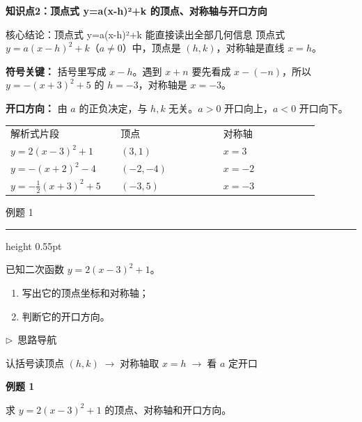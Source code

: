 \documentclass{exam-zh}
\newcommand{\edukai}{\kaishu}
\newcommand{\eduSectionTitle}[1]{%
  \needspace{5\baselineskip}%
  \vspace{2mm}
  {\color{edu-blue}\bfseries\large #1}\par
  \vspace{3mm}
}
\newenvironment{eduSubQuestionItem}[1]{%
  \needspace{4\baselineskip}%
  \vspace{2mm}
  \par\noindent
  \hangindent=8mm\hangafter=1
  {\color{edu-blue}\bfseries #1}\enspace
  \begingroup
  \color{edu-ink}
}{%
  \endgroup
  \par
  \vspace{3mm}
}
\newenvironment{eduAuxItem}[1]{%
  \needspace{4\baselineskip}%
  \vspace{2mm}
  \par\noindent
  \hangindent=8mm\hangafter=1
  {\color{edu-blue}\edukai $\triangleright$~#1}\enspace
  \begingroup
  \color{edu-ink}
  \edukai
}{%
  \endgroup
  \par
  \vspace{4mm}
}
\newenvironment{eduProblemBlock}[1][题目]{%
  \needspace{8\baselineskip}
  {\small\color{edu-muted}#1}\par
  \vspace{1.5mm}
  {\color{edu-blue}\hrule height 0.55pt}
  \vspace{4.5mm}
  \begingroup
  \color{edu-ink}
  \large
  \setlength{\parskip}{2.2mm}
  \linespread{1.20}\selectfont
}{%
  \par
  \endgroup
  \vspace{6mm}
}
\begin{document}
\eduSectionTitle{知识点2：顶点式 y=a(x-h)²+k 的顶点、对称轴与开口方向}


\begin{eduSolutionBox}{核心结论：顶点式 y=a(x-h)²+k 能直接读出全部几何信息}
  \begingroup
  \setlength{\parskip}{2.5mm}
顶点式 $y=a(x-h)^2+k$（$a\ne0$）中，顶点是 $(h,k)$，对称轴是直线 $x=h$。\par
\textbf{符号关键：} 括号里写成 $x-h$。遇到 $x+n$ 要先看成 $x-(-n)$，所以 $y=-(x+3)^2+5$ 的 $h=-3$，对称轴是 $x=-3$。\par
\textbf{开口方向：} 由 $a$ 的正负决定，与 $h,k$ 无关。$a>0$ 开口向上，$a<0$ 开口向下。\par
\begin{tabular}{p{0.30\linewidth}p{0.30\linewidth}p{0.28\linewidth}}
解析式片段 & 顶点 & 对称轴\\
$y=2(x-3)^2+1$ & $(3,1)$ & $x=3$\\
$y=-(x+2)^2-4$ & $(-2,-4)$ & $x=-2$\\
$y=-\tfrac12(x+3)^2+5$ & $(-3,5)$ & $x=-3$\\
\end{tabular}
\par
  \endgroup
\end{eduSolutionBox}




\begin{eduProblemBlock}[例题 1]
已知二次函数 $y=2(x-3)^2+1$。
\begin{enumerate}[label=(\arabic*)]
  \item 写出它的顶点坐标和对称轴；
  \item 判断它的开口方向。
\end{enumerate}

\end{eduProblemBlock}





\begin{eduAuxItem}{思路导航}
认括号读顶点 $(h,k)$$\;\to\;$对称轴取 $x=h$$\;\to\;$看 $a$ 定开口\end{eduAuxItem}




\begin{eduSubQuestionItem}{例题 1}
求 $y=2(x-3)^2+1$ 的顶点、对称轴和开口方向。\end{eduSubQuestionItem}
\end{document}
